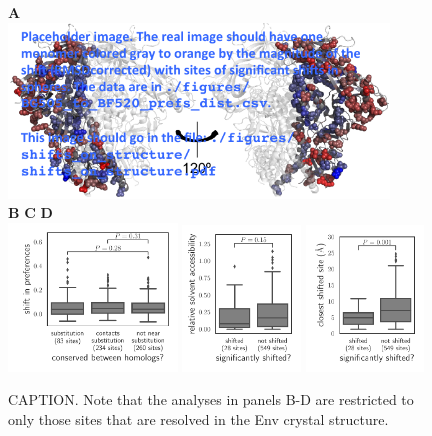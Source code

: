 \documentclass[9pt,lineno]{elife}
\begin{document}
\begin{figure}
{\bf \Large A} \\
\includegraphics[width=0.9\textwidth]{figures/shifts_on_structure/shifts_on_structure.pdf}
\\
{\bf \Large B} \hspace{0.38\textwidth} {\bf \Large C} \hspace{0.28\textwidth} {\bf \Large D} \\
\includegraphics[width=0.4\textwidth]{figures/conservation_vs_shifts.pdf} 
\hspace{0.01\textwidth}
\includegraphics[width=0.28\textwidth]{figures/rsa_vs_shifts.pdf}
\hspace{0.01\textwidth}
\includegraphics[width=0.28\textwidth]{figures/shifts_proximity.pdf}
\caption{\label{fig:shiftfeatures}
CAPTION.
Note that the analyses in panels B-D are restricted to only those sites that are resolved in the Env crystal structure.
}
\end{figure}
\end{document}
